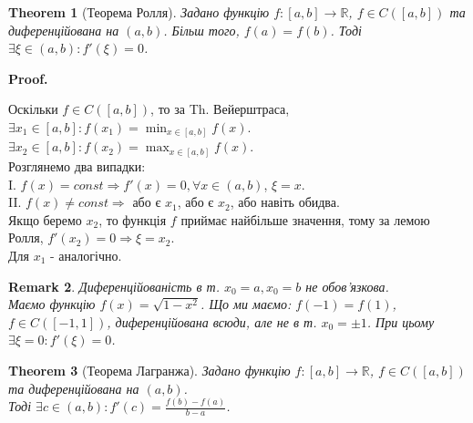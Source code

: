 \documentclass[a4paper, 14pt]{article}
\makeatletter
\def\huge{\displaystyle}
\def\qed{$\blacksquare$}
\theoremstyle{theoremdd}
\newtheorem{theorem}{Theorem}[subsection]
\theoremstyle{theoremdd}
\theoremstyle{theoremdd}
\theoremstyle{theoremdd}
\theoremstyle{theoremdd}
\theoremstyle{theoremdd}
\newtheorem{remark}[theorem]{Remark}
\theoremstyle{theoremdd}
\theoremstyle{theoremdd}
\renewenvironment{proof}[1][Proof.\\]{\par
\pushQED{\hfill \qed}%
\normalfont \topsep6\p@\@plus6\p@\relax
\trivlist
\item\relax
{\bfseries
#1\@addpunct{.}}\hspace\labelsep\ignorespaces
}{%
\popQED\endtrivlist\@endpefalse
}
\makeatother
\begin{document}
\begin{figure}[H]
\centering
{}
\end{figure}

\begin{theorem}[Теорема Ролля]
Задано функцію $f: [a,b] \to \mathbb{R}$, $f \in C([a,b])$ та диференційована на $(a,b)$. Більш того, $f(a) = f(b)$. Тоді $\exists \xi \in (a,b): f'(\xi) = 0$.
\end{theorem}

\begin{proof}
Оскільки $f \in C([a,b])$, то за Th. Вейерштраса,\\
$\exists x_1 \in [a,b]: f(x_1) = \huge \min_{x \in [a,b]} f(x)$.\\
$\exists x_2 \in [a,b]: f(x_2) = \huge \max_{x \in [a,b]} f(x)$.\\
Розглянемо два випадки:\\
I. $f(x) = const \Rightarrow f'(x) = 0, \forall x \in (a,b)$, $\xi = x$.\\
II. $f(x) \neq const \Rightarrow$ або є $x_1$, або є $x_2$, або навіть обидва.\\
Якщо беремо $x_2$, то функція $f$ приймає найбільше значення, тому за лемою Ролля, $f'(x_2) = 0 \Rightarrow \xi = x_2$.\\
Для $x_1$ - аналогічно.
\end{proof}

\begin{remark}
Диференційованість в т. $x_0=a,x_0=b$ не обов'язкова.\\
Маємо функцію $f(x) = \sqrt{1-x^2}$. Що ми маємо: $f(-1) = f(1)$, $f \in C([-1,1])$, диференційована всюди, але не в т. $x_0 = \pm 1$. При цьому $\exists \xi = 0: f'(\xi) = 0$.
\end{remark}

\begin{theorem}[Теорема Лагранжа]
Задано функцію $f: [a,b] \to \mathbb{R}$, $f \in C([a,b])$ та диференційована на $(a,b)$. \\ Тоді $\exists c \in (a,b): f'(c) = \huge \frac{f(b)-f(a)}{b-a}$.
\end{theorem}
\end{document}

